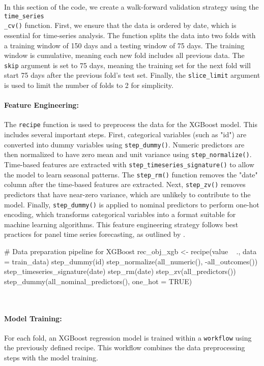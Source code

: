 \documentclass[12pt]{report}
\begin{document}
In this section of the code, we create a walk-forward validation strategy using the
\texttt{time\_series}\\ \texttt{\_cv()} function. First, we ensure that the data is ordered by date, which is essential for time-series analysis. The function splits the data into two folds with a training window of 150 days and a testing window of 75 days. The training window is cumulative, meaning each new fold includes all previous data. The \texttt{skip} argument is set to 75 days, meaning the training set for the next fold will start 75 days after the previous fold's test set. Finally, the \texttt{slice\_limit} argument is used to limit the number of folds to 2 for simplicity.

\paragraph{Feature Engineering:}
The \texttt{recipe} function is used to preprocess the data for the XGBoost model. This includes several important steps. First, categorical variables (such as "id") are converted into dummy variables using \texttt{step\_dummy()}. Numeric predictors are then normalized to have zero mean and unit variance using \texttt{step\_normalize()}. Time-based features are extracted with
\texttt{step\_timeseries\_signature()} to allow the model to learn seasonal patterns. The \texttt{step\_rm()} function removes the "date" column after the time-based features are extracted. Next, \texttt{step\_zv()} removes predictors that have near-zero variance, which are unlikely to contribute to the model. Finally, \texttt{step\_dummy()} is applied to nominal predictors to perform one-hot encoding, which transforms categorical variables into a format suitable for machine learning algorithms. This feature engineering strategy follows best practices for panel time series forecasting, as outlined by \cite{modeltime_panel_data}.\\


\begin{code}
# Data preparation pipeline for XGBoost
rec_obj_xgb <- recipe(value ~ ., data = train_data) %
  step_dummy(id) %
  step_normalize(all_numeric(), -all_outcomes()) %
  step_timeseries_signature(date) %
  step_rm(date) %
  step_zv(all_predictors()) %
  step_dummy(all_nominal_predictors(), one_hot = TRUE)
\end{code}\\


\paragraph{Model Training:}
For each fold, an XGBoost regression model is trained within a \texttt{workflow} using the previously defined recipe. This workflow combines the data preprocessing steps with the model training.\\
\end{document}

